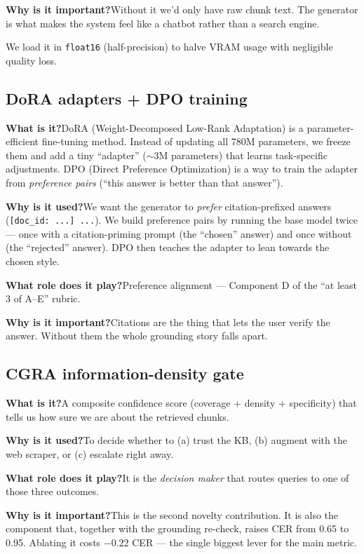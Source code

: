 \documentclass[11pt,a4paper]{article}
\begin{document}
\textbf{Why is it important?}\quad Without it we'd only have raw chunk text. The generator is what makes the system feel like a chatbot rather than a search engine.

We load it in \texttt{float16} (half-precision) to halve VRAM usage with negligible quality loss.

\subsection{DoRA adapters + DPO training}

\textbf{What is it?}\quad DoRA (Weight-Decomposed Low-Rank Adaptation) is a parameter-efficient fine-tuning method. Instead of updating all 780M parameters, we freeze them and add a tiny ``adapter'' ($\sim$3M parameters) that learns task-specific adjustments. DPO (Direct Preference Optimization) is a way to train the adapter from \emph{preference pairs} (``this answer is better than that answer'').

\textbf{Why is it used?}\quad We want the generator to \emph{prefer} citation-prefixed answers (\texttt{[doc\_id: ...] ...}). We build preference pairs by running the base model twice --- once with a citation-priming prompt (the ``chosen'' answer) and once without (the ``rejected'' answer). DPO then teaches the adapter to lean towards the chosen style.

\textbf{What role does it play?}\quad Preference alignment --- Component D of the ``at least 3 of A--E'' rubric.

\textbf{Why is it important?}\quad Citations are the thing that lets the user verify the answer. Without them the whole grounding story falls apart.

\subsection{CGRA information-density gate}

\textbf{What is it?}\quad A composite confidence score (coverage + density + specificity) that tells us how sure we are about the retrieved chunks.

\textbf{Why is it used?}\quad To decide whether to (a) trust the KB, (b) augment with the web scraper, or (c) escalate right away.

\textbf{What role does it play?}\quad It is the \emph{decision maker} that routes queries to one of those three outcomes.

\textbf{Why is it important?}\quad This is the second novelty contribution. It is also the component that, together with the grounding re-check, raises CER from 0.65 to 0.95. Ablating it costs $-0.22$ CER --- the single biggest lever for the main metric.
\end{document}
